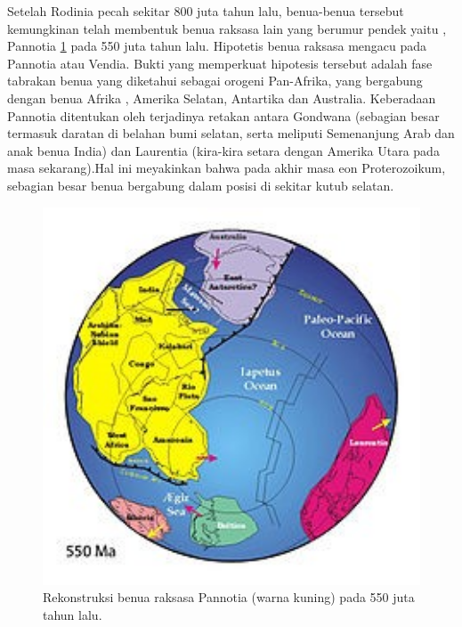 Setelah Rodinia pecah sekitar 800 juta tahun lalu, benua-benua tersebut kemungkinan telah membentuk benua raksasa lain yang berumur pendek yaitu , Pannotia \ref{BenuaRaksasaPannotia} pada 550 juta tahun lalu. Hipotetis benua raksasa mengacu pada Pannotia atau Vendia. Bukti yang memperkuat hipotesis tersebut adalah fase tabrakan benua yang diketahui sebagai orogeni Pan-Afrika, yang bergabung dengan benua Afrika , Amerika Selatan, Antartika dan Australia. Keberadaan Pannotia ditentukan oleh terjadinya retakan antara Gondwana (sebagian besar termasuk daratan di belahan bumi selatan, serta meliputi Semenanjung Arab dan anak benua India) dan Laurentia (kira-kira setara dengan Amerika Utara pada masa sekarang).Hal ini meyakinkan bahwa pada akhir masa eon Proterozoikum, sebagian besar benua bergabung dalam posisi di sekitar kutub selatan.

\begin{figure}[ht]
    \centerline{\includegraphics[width=1\textwidth]{figures/BenuaRaksasaPannotia.JPG}}
    \caption{Rekonstruksi benua raksasa Pannotia (warna kuning) pada 550 juta tahun lalu.}
    \label{BenuaRaksasaPannotia}
    \end{figure}


